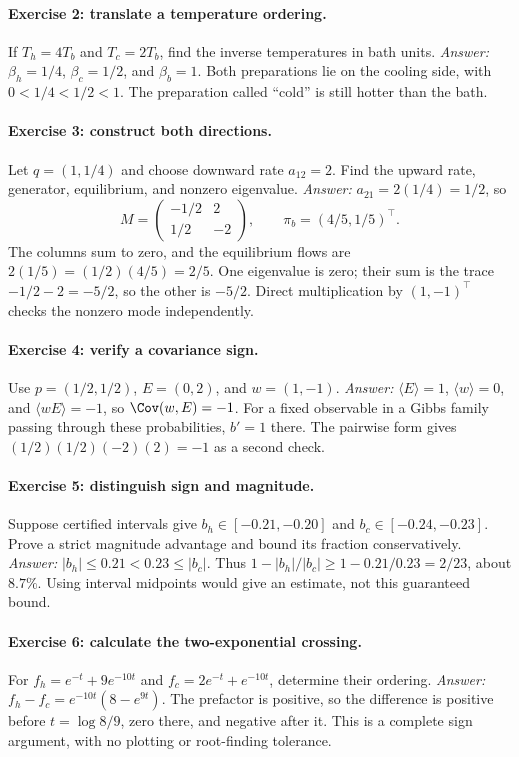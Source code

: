 \paragraph{Exercise 2: translate a temperature ordering.}
If $T_h=4T_b$ and $T_c=2T_b$, find the inverse temperatures in bath units.
\emph{Answer:} $\beta_h=1/4$, $\beta_c=1/2$, and $\beta_b=1$.
Both preparations lie on the cooling side, with $0<1/4<1/2<1$.
The preparation called ``cold'' is still hotter than the bath.

\paragraph{Exercise 3: construct both directions.}
Let $q=(1,1/4)$ and choose downward rate $a_{12}=2$. Find the upward rate,
generator, equilibrium, and nonzero eigenvalue. \emph{Answer:}
$a_{21}=2(1/4)=1/2$, so
\[
M=\begin{pmatrix}-1/2&2\\1/2&-2\end{pmatrix},
\qquad \pi_b=(4/5,1/5)^\top.
\]
The columns sum to zero, and the equilibrium flows are
$2(1/5)=(1/2)(4/5)=2/5$. One eigenvalue is zero; their sum is the trace
$-1/2-2=-5/2$, so the other is $-5/2$. Direct multiplication by $(1,-1)^\top$
checks the nonzero mode independently.

\paragraph{Exercise 4: verify a covariance sign.}
Use $p=(1/2,1/2)$, $E=(0,2)$, and $w=(1,-1)$.
\emph{Answer:} $\langle E\rangle=1$, $\langle w\rangle=0$, and
$\langle wE\rangle=-1$, so $\Cov(w,E)=-1$. For a fixed observable in a
Gibbs family passing through these probabilities, $b'=1$ there. The
pairwise form gives $(1/2)(1/2)(-2)(2)=-1$ as a second check.

\paragraph{Exercise 5: distinguish sign and magnitude.}
Suppose certified intervals give $b_h\in[-0.21,-0.20]$ and
$b_c\in[-0.24,-0.23]$. Prove a strict magnitude advantage and bound its
fraction conservatively. \emph{Answer:} $|b_h|\leq0.21<0.23\leq|b_c|$.
Thus $1-|b_h|/|b_c|\geq1-0.21/0.23=2/23$, about $8.7\%$.
Using interval midpoints would give an estimate, not this guaranteed bound.

\paragraph{Exercise 6: calculate the two-exponential crossing.}
For $f_h=e^{-t}+9e^{-10t}$ and $f_c=2e^{-t}+e^{-10t}$, determine their
ordering. \emph{Answer:} $f_h-f_c=e^{-10t}(8-e^{9t})$.
The prefactor is positive, so the difference is positive before
$t=\log8/9$, zero there, and negative after it. This is a complete sign
argument, with no plotting or root-finding tolerance.


